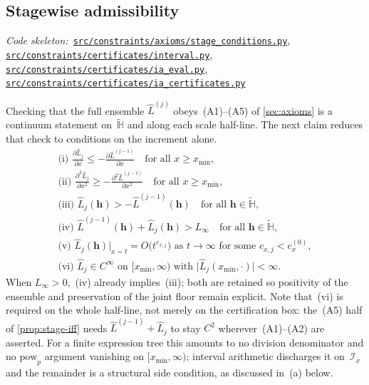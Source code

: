 \documentclass[11pt]{article}
\newcommand{\calI}{\mathcal{I}}
\newcommand{\bbH}{\mathbb{H}}
\newcommand{\Lhat}{\hat{L}}
\newcommand{\repoBlob}{https://github.com/krichelj/ByteBoost-Shape-Constrained-Boosted-SR/blob/main/}
\newcommand{\pyFile}[1]{\href{\repoBlob#1}{\nolinkurl{#1}}}
\newcommand{\codeRef}[1]{%
  \par\nobreak\noindent
  {\footnotesize\textit{Code skeleton:}~#1}\par\smallskip}
\theoremstyle{plain}
\theoremstyle{remark}
\begin{document}
\subsection{Stagewise admissibility}\label{sec:stage-admiss}\label{sec:certificates}
\codeRef{\pyFile{src/constraints/axioms/stage_conditions.py}, \pyFile{src/constraints/certificates/interval.py}, \pyFile{src/constraints/certificates/ia_eval.py}, \pyFile{src/constraints/certificates/ia_certificates.py}}
Checking that the full ensemble $\Lhat^{(j)}$ obeys~(A1)--(A5) of \cref{sec:axioms} is a continuum statement on~$\widetilde{\bbH}$ and along each scale half-line.
The next claim reduces that check to conditions on the increment alone.
\begin{equation}\label{eq:stage-admiss-bb}
\begin{gathered}
\text{(i) } \frac{\partial \Lhat_j}{\partial x}
   \leq -\frac{\partial \Lhat^{(j-1)}}{\partial x}
   \quad\text{for all } x \geq x_{\min},
\\[2pt]
\text{(ii) } \frac{\partial^2 \Lhat_j}{\partial x^2}
   \geq -\frac{\partial^2 \Lhat^{(j-1)}}{\partial x^2}
   \quad\text{for all } x \geq x_{\min},
\\[2pt]
\text{(iii) } \Lhat_j(\mathbf{h}) > -\Lhat^{(j-1)}(\mathbf{h})
   \quad\text{for all } \mathbf{h} \in \widetilde{\bbH},
\\[2pt]
\text{(iv) } \Lhat^{(j-1)}(\mathbf{h}) + \Lhat_j(\mathbf{h}) > L_\infty
   \quad\text{for all } \mathbf{h} \in \widetilde{\bbH},
\\[2pt]
\text{(v) } \Lhat_j(\mathbf{h})\big|_{x=t} = O\bigl(t^{c_{x,j}}\bigr)
   \text{ as } t \to \infty
   \text{ for some } c_{x,j} < c_x^{(0)},
\\[2pt]
\text{(vi) } \Lhat_j \in C^\infty
   \text{ on } [x_{\min}, \infty)
   \text{ with }
   \bigl|\Lhat_j(x_{\min}, \cdot)\bigr| < \infty.
\end{gathered}
\end{equation}
When $L_\infty > 0$,~(iv) already implies~(iii); both are retained so positivity of the
ensemble and preservation of the joint floor remain explicit.
Note that~(vi) is required on the whole half-line, not merely on the certification box: the~(A5) half of \cref{prop:stage-iff} needs $\Lhat^{(j-1)}+\Lhat_j$ to stay $C^2$ wherever~(A1)--(A2) are asserted.
For a finite expression tree this amounts to no division denominator and no $\mathrm{pow}_p$ argument vanishing on $[x_{\min},\infty)$; interval arithmetic discharges it on~$\calI_x$ and the remainder is a structural side condition, as discussed in~(a) below.
\end{document}
